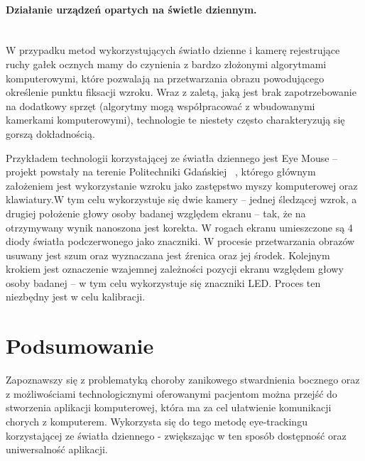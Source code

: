 \documentclass[twoside,a4paper]{book}
\begin{document}
\paragraph{Działanie urządzeń  opartych na świetle dziennym. }\leavevmode\\
W przypadku  metod  wykorzystujących światło dzienne i kamerę rejestrujące ruchy gałek ocznych mamy do czynienia z bardzo złożonymi algorytmami komputerowymi, które pozwalają na przetwarzania obrazu powodującego określenie punktu fiksacji wzroku. Wraz z zaletą, jaką jest brak zapotrzebowanie na dodatkowy sprzęt (algorytmy mogą współpracować z wbudowanymi kamerkami komputerowymi), technologie te niestety często charakteryzują się gorszą dokładnością.

Przykładem technologii korzystającej ze światła dziennego jest Eye Mouse – projekt powstały na terenie Politechniki Gdańskiej ~\cite{eyemouse}, którego głównym założeniem jest wykorzystanie wzroku jako zastępstwo myszy komputerowej oraz klawiatury.W tym celu wykorzystuje się dwie kamery – jednej śledzącej wzrok, a drugiej położenie głowy osoby badanej względem ekranu – tak, że na otrzymywany wynik nanoszona jest korekta.  W rogach ekranu umieszczone są 4 diody światła podczerwonego jako znaczniki. W procesie przetwarzania obrazów usuwany jest szum oraz wyznaczana jest źrenica oraz jej środek. Kolejnym krokiem jest oznaczenie wzajemnej zależności pozycji ekranu względem głowy osoby badanej – w tym celu wykorzystuje się znaczniki LED. Proces ten niezbędny jest w celu kalibracji.
\section{Podsumowanie}
Zapoznawszy się z problematyką choroby zanikowego stwardnienia bocznego oraz z możliwościami technologicznymi oferowanymi pacjentom można przejść do stworzenia aplikacji komputerowej, która ma za cel ułatwienie komunikacji chorych z komputerem. Wykorzysta się do tego metodę eye-trackingu korzystającej ze światła dziennego - zwiększając w ten sposób dostępność oraz uniwersalność aplikacji. 
\end{document}
